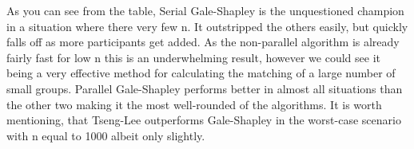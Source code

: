 As you can see from the table, Serial Gale-Shapley is the unquestioned champion in a situation where there very few n. It outstripped the others easily, but quickly falls off as more participants get added. As the non-parallel algorithm is already fairly fast for low n this is an underwhelming result, however we could see it being a very effective method for calculating the matching of a large number of small groups. Parallel Gale-Shapley performs better in almost all situations than the other two making it the most well-rounded of the algorithms. It is worth mentioning, that Tseng-Lee outperforms Gale-Shapley in the worst-case scenario with n equal to 1000 albeit only slightly.
